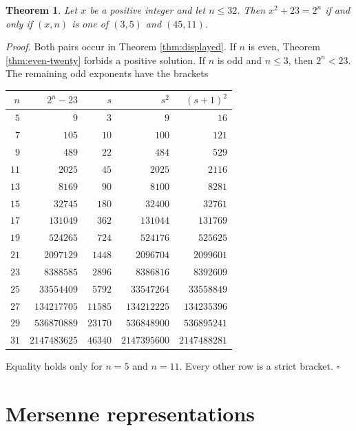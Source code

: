 \documentclass[11pt,letterpaper]{article}
\newtheorem{theorem}{Theorem}
\newenvironment{proof}{\noindent\textit{Proof.}}{\hfill\(\square\)}
\begin{document}
\begin{theorem}
\label{thm:box-twenty}
Let \(x\) be a positive integer and let \(n\le 32\). Then \(x^2+23=2^n\) if and only if \((x,n)\) is one of \((3,5)\) and \((45,11)\).
\end{theorem}

\begin{proof}
Both pairs occur in Theorem \ref{thm:displayed}. If \(n\) is even, Theorem \ref{thm:even-twenty} forbids a positive solution. If \(n\) is odd and \(n\le 3\), then \(2^n<23\). The remaining odd exponents have the brackets

\begin{center}
\begin{tabular}{rrrrr}
\toprule
\(n\) & \(2^n-23\) & \(s\) & \(s^2\) & \((s+1)^2\) \\
\midrule
\(5\) & \(9\) & \(3\) & \(9\) & \(16\) \\
\(7\) & \(105\) & \(10\) & \(100\) & \(121\) \\
\(9\) & \(489\) & \(22\) & \(484\) & \(529\) \\
\(11\) & \(2025\) & \(45\) & \(2025\) & \(2116\) \\
\(13\) & \(8169\) & \(90\) & \(8100\) & \(8281\) \\
\(15\) & \(32745\) & \(180\) & \(32400\) & \(32761\) \\
\(17\) & \(131049\) & \(362\) & \(131044\) & \(131769\) \\
\(19\) & \(524265\) & \(724\) & \(524176\) & \(525625\) \\
\(21\) & \(2097129\) & \(1448\) & \(2096704\) & \(2099601\) \\
\(23\) & \(8388585\) & \(2896\) & \(8386816\) & \(8392609\) \\
\(25\) & \(33554409\) & \(5792\) & \(33547264\) & \(33558849\) \\
\(27\) & \(134217705\) & \(11585\) & \(134212225\) & \(134235396\) \\
\(29\) & \(536870889\) & \(23170\) & \(536848900\) & \(536895241\) \\
\(31\) & \(2147483625\) & \(46340\) & \(2147395600\) & \(2147488281\) \\
\bottomrule
\end{tabular}
\end{center}

Equality holds only for \(n=5\) and \(n=11\). Every other row is a strict bracket.
\end{proof}

\section{Mersenne representations}
\end{document}
